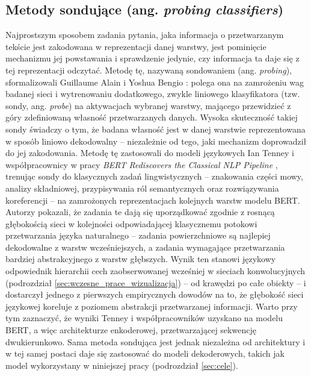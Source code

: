 \subsection{Metody sondujące (ang. \textit{probing classifiers})}
\label{sec:probing}
Najprostszym sposobem zadania pytania, jaka informacja o przetwarzanym tekście jest zakodowana w reprezentacji danej warstwy, jest pominięcie mechanizmu jej powstawania i sprawdzenie jedynie, czy informacja ta daje się z tej reprezentacji odczytać. Metodę tę, nazywaną sondowaniem (ang. \textit{probing}), sformalizowali Guillaume Alain i Yoshua Bengio \cite{alain_2016_understanding_intermediate_layers_using_linear_classifier_probes}: polega ona na zamrożeniu wag badanej sieci i wytrenowaniu dodatkowego, zwykle liniowego klasyfikatora (tzw. sondy, ang. \textit{probe}) na aktywacjach wybranej warstwy, mającego przewidzieć z góry zdefiniowaną własność przetwarzanych danych. Wysoka skuteczność takiej sondy świadczy o tym, że badana własność jest w danej warstwie reprezentowana w sposób liniowo dekodowalny -- niezależnie od tego, jaki mechanizm doprowadził do jej zakodowania. \newline
Metodę tę zastosowali do modeli językowych Ian Tenney i współpracownicy w pracy \textit{BERT Rediscovers the Classical NLP Pipeline} \cite{tenney_2019_bert_rediscovers_classical_nlp_pipeline}, trenując sondy do klasycznych zadań lingwistycznych -- znakowania części mowy, analizy składniowej, przypisywania ról semantycznych oraz rozwiązywania koreferencji -- na zamrożonych reprezentacjach kolejnych warstw modelu BERT. Autorzy pokazali, że zadania te dają się uporządkować zgodnie z rosnącą głębokością sieci w kolejności odpowiadającej klasycznemu potokowi przetwarzania języka naturalnego -- zadania powierzchniowe są najlepiej dekodowalne z warstw wcześniejszych, a zadania wymagające przetwarzania bardziej abstrakcyjnego z warstw głębszych. Wynik ten stanowi językowy odpowiednik hierarchii cech zaobserwowanej wcześniej w sieciach konwolucyjnych (podrozdział \ref{sec:wczesne_prace_wizualizacja}) -- od krawędzi po całe obiekty -- i dostarczył jednego z pierwszych empirycznych dowodów na to, że głębokość sieci językowej koreluje z poziomem abstrakcji przetwarzanej informacji. \newline
Warto przy tym zaznaczyć, że wyniki Tenney i współpracowników uzyskano na modelu BERT, a więc architekturze enkoderowej, przetwarzającej sekwencję dwukierunkowo. Sama metoda sondująca jest jednak niezależna od architektury i w tej samej postaci daje się zastosować do modeli dekoderowych, takich jak model wykorzystany w niniejszej pracy (podrozdział \ref{sec:cele}).

